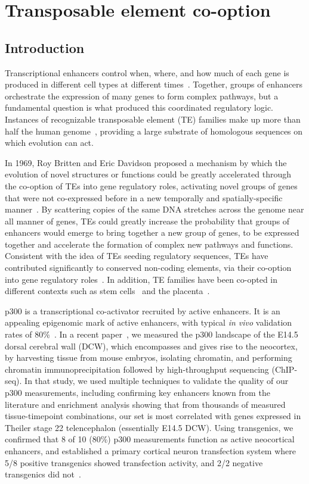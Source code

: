 \chapter{Transposable element co-option}
\label{chap:mer130}

\section{Introduction}

Transcriptional enhancers control when, where, and how much of each gene
is produced in different cell types at different
times~\citep{Levo:2014hl}. Together, groups of enhancers orchestrate the
expression of many genes to form complex pathways, but a fundamental
question is what produced this coordinated regulatory logic. Instances
of recognizable transposable element (TE) families make up more than
half the human genome~\citep{Wheeler:2012im}, providing a large substrate of
homologous sequences on which evolution can act.

In 1969, Roy Britten and Eric Davidson proposed a mechanism by which the
evolution of novel structures or functions could be greatly accelerated
through the co-option of TEs into gene regulatory roles, activating
novel groups of genes that were not co-expressed before in a new
temporally and spatially-specific manner~\citep{Britten:1971tl}. By
scattering copies of the same DNA stretches across the genome near all
manner of genes, TEs could greatly increase the probability that groups
of enhancers would emerge to bring together a new group of genes, to be
expressed together and accelerate the formation of complex new pathways
and functions. Consistent with the idea of TEs seeding regulatory
sequences, TEs have contributed significantly to conserved non-coding
elements, via their co-option into gene regulatory
roles~\citep{Lowe:2007je}. In addition, TE families have been co-opted in
different contexts such as stem cells~\citep{Kunarso:2010kt} and the
placenta~\citep{Chuong:2013hj}.

p300 is a transcriptional co-activator recruited by active enhancers. It
is an appealing epigenomic mark of active enhancers, with typical
\emph{in vivo} validation rates of 80\%~\citep{May:2012iy}. In a recent
paper~\citep{Wenger:2013jd}, we measured the p300 landscape of the E14.5
dorsal cerebral wall (DCW), which encompasses and gives rise to the
neocortex, by harvesting tissue from mouse embryos, isolating chromatin,
and performing chromatin immunoprecipitation followed by high-throughput
sequencing (ChIP-seq). In that study, we used multiple techniques to
validate the quality of our p300 measurements, including confirming key
enhancers known from the literature and enrichment analysis showing that
from thousands of measured tissue-timepoint combinations, our set is
most correlated with genes expressed in Theiler stage 22 telencephalon
(essentially E14.5 DCW). Using transgenics, we confirmed that 8 of 10
(80\%) p300 measurements function as active neocortical enhancers, and
established a primary cortical neuron transfection system where 5/8
positive transgenics showed transfection activity, and 2/2 negative
transgenics did not~\citep{Wenger:2013jd}.

